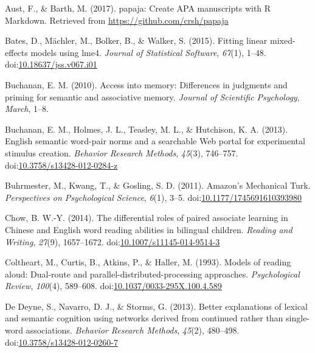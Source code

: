 \documentclass[english,man]{apa6}
\theoremstyle{definition}
\theoremstyle{definition}
\theoremstyle{definition}
\theoremstyle{remark}
\begin{document}
\setlength{\parindent}{-0.5in} \setlength{\leftskip}{0.5in}

\hypertarget{refs}{}
\hypertarget{ref-Aust2017}{}
Aust, F., \& Barth, M. (2017). papaja: Create APA manuscripts with R
Markdown. Retrieved from \url{https://github.com/crsh/papaja}

\hypertarget{ref-Bates2015}{}
Bates, D., Mächler, M., Bolker, B., \& Walker, S. (2015). Fitting linear
mixed-effects models using lme4. \emph{Journal of Statistical Software},
\emph{67}(1), 1--48.
doi:\href{https://doi.org/10.18637/jss.v067.i01}{10.18637/jss.v067.i01}

\hypertarget{ref-Buchanan2010}{}
Buchanan, E. M. (2010). Access into memory: Differences in judgments and
priming for semantic and associative memory. \emph{Journal of Scientific
Psychology}, \emph{March}, 1--8.

\hypertarget{ref-Buchanan2013}{}
Buchanan, E. M., Holmes, J. L., Teasley, M. L., \& Hutchison, K. A.
(2013). English semantic word-pair norms and a searchable Web portal for
experimental stimulus creation. \emph{Behavior Research Methods},
\emph{45}(3), 746--757.
doi:\href{https://doi.org/10.3758/s13428-012-0284-z}{10.3758/s13428-012-0284-z}

\hypertarget{ref-Buhrmester2011}{}
Buhrmester, M., Kwang, T., \& Gosling, S. D. (2011). Amazon's Mechanical
Turk. \emph{Perspectives on Psychological Science}, \emph{6}(1), 3--5.
doi:\href{https://doi.org/10.1177/1745691610393980}{10.1177/1745691610393980}

\hypertarget{ref-Chow2014}{}
Chow, B. W.-Y. (2014). The differential roles of paired associate
learning in Chinese and English word reading abilities in bilingual
children. \emph{Reading and Writing}, \emph{27}(9), 1657--1672.
doi:\href{https://doi.org/10.1007/s11145-014-9514-3}{10.1007/s11145-014-9514-3}

\hypertarget{ref-Coltheart1993}{}
Coltheart, M., Curtis, B., Atkins, P., \& Haller, M. (1993). Models of
reading aloud: Dual-route and parallel-distributed-processing
approaches. \emph{Psychological Review}, \emph{100}(4), 589--608.
doi:\href{https://doi.org/10.1037/0033-295X.100.4.589}{10.1037/0033-295X.100.4.589}

\hypertarget{ref-DeDeyne2013}{}
De Deyne, S., Navarro, D. J., \& Storms, G. (2013). Better explanations
of lexical and semantic cognition using networks derived from continued
rather than single-word associations. \emph{Behavior Research Methods},
\emph{45}(2), 480--498.
doi:\href{https://doi.org/10.3758/s13428-012-0260-7}{10.3758/s13428-012-0260-7}
\end{document}
